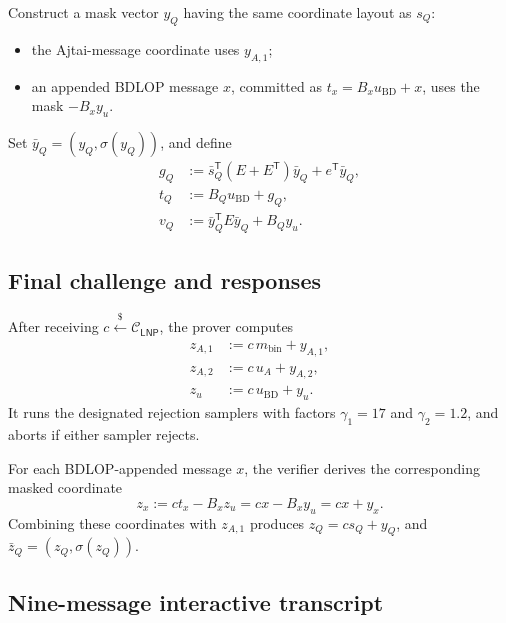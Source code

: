 \documentclass[11pt,a4paper]{article}
\newcommand{\LNP}{\mathsf{LNP}}
\newcommand{\getsr}{\xleftarrow{\$}}
\newcommand{\calC}{\mathcal{C}}
\newcommand{\transpose}{\mathsf{T}}
\begin{document}
Construct a mask vector \(y_Q\) having the same coordinate layout as \(s_Q\):
\begin{itemize}
  \item the Ajtai-message coordinate uses \(y_{A,1}\);
  \item an appended BDLOP message \(x\), committed as
  \(t_x=B_xu_{\mathrm{BD}}+x\), uses the mask \(-B_xy_u\).
\end{itemize}
Set \(\bar y_Q=(y_Q,\sigma(y_Q))\), and define
\begin{align}
  g_Q&:=\bar s_Q^{\transpose}(E+E^{\transpose})\bar y_Q
       +e^{\transpose}\bar y_Q,
  \label{eq:gQ}\\
  t_Q&:=B_Qu_{\mathrm{BD}}+g_Q,
  \label{eq:tQ}\\
  v_Q&:=\bar y_Q^{\transpose}E\bar y_Q+B_Qy_u.
  \label{eq:vQ}
\end{align}

\subsection{Final challenge and responses}

After receiving \(c\getsr\calC_{\LNP}\), the prover computes
\begin{align}
  z_{A,1}&:=c\,m_{\mathrm{bin}}+y_{A,1},
  \label{eq:zA1}\\
  z_{A,2}&:=c\,u_A+y_{A,2},
  \label{eq:zA2}\\
  z_u&:=c\,u_{\mathrm{BD}}+y_u.
  \label{eq:zu}
\end{align}
It runs the designated rejection samplers with factors \(\gamma_1=17\) and
\(\gamma_2=1.2\), and aborts if either sampler rejects.

For each BDLOP-appended message \(x\), the verifier derives the corresponding
masked coordinate
\begin{equation}
  z_x:=ct_x-B_xz_u=cx-B_xy_u=cx+y_x.
  \label{eq:derive-zx}
\end{equation}
Combining these coordinates with \(z_{A,1}\) produces
\(z_Q=cs_Q+y_Q\), and
\(\bar z_Q=(z_Q,\sigma(z_Q))\).

\subsection{Nine-message interactive transcript}
\end{document}
